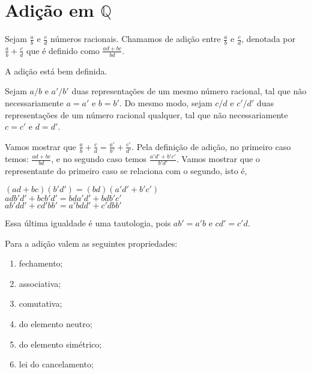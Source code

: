 \documentclass[../main.tex]{subfiles}
\begin{document}
\section{Adição em $\mathbb{Q}$}
\begin{defi}
    Sejam $\frac{a}{b}$ e $\frac{c}{d}$ números racionais. Chamamos de adição entre $\frac{a}{b}$ e $\frac{c}{d}$, denotada por $\frac{a}{b} + \frac{c}{d}$ que é definido como $\frac{ad+bc}{bd}$.
\end{defi}
\begin{prop}
    A adição está bem definida.
\end{prop}
\begin{dem}
    Sejam $a/b$ e $a'/b'$ duas representações de um mesmo número racional, tal que não necessariamente $a = a'$ e $b=b'$. Do mesmo modo, sejam $c/d$ e $c'/d'$ duas representações de um número racional qualquer, tal que não necessariamente $c=c'$ e $d=d'$.
    
    Vamos mostrar que $\frac{a}{b} + \frac{c}{d} = \frac{a'}{b'} + \frac{c'}{d'}$.
    Pela definição de adição, no primeiro caso temos: $\frac{ad+bc}{bd}$, e no segundo caso temos $\frac{a'd'+b'c'}{b'd'}$.
    Vamos mostrar que o representante do primeiro caso se relaciona com o segundo, isto é, 
    \begin{center}
        $(ad+bc)(b'd') = (bd)(a'd'+b'c')$ \\
        $adb'd'+bcb'd' = bda'd' + bdb'c'$ \\
        $ab'dd' + cd'bb' = a'bdd' + c'dbb'$
    \end{center}
    Essa última igualdade é uma tautologia, pois $ab' = a'b$ e $cd' = c'd$.
\end{dem}
\begin{prop}{Para a adição valem as seguintes propriedades:}
    \begin{enumerate}[label=(\roman*)]
        \item fechamento;
        \item associativa;
        \item comutativa;
        \item do elemento neutro; 
        \item do elemento simétrico;
        \item lei do cancelamento;
    \end{enumerate}
\end{prop}
\end{document}
